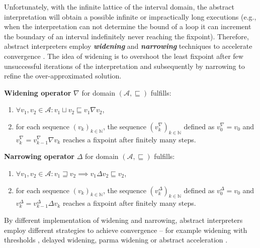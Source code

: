 Unfortunately, with the infinite lattice of the interval
domain, the
abstract interpretation will obtain a possible infinite or impractically long
executions (e.g., when the interpretation can not determine the bound of a loop
it can increment the boundary of an interval indefinitely never reaching the
fixpoint). Therefore, abstract interpreters employ \textbf{\emph{widening}} and
\textbf{\emph{narrowing}} techniques to accelerate convergence \cite{Cousot1992a,
Cortesi2011}.  The idea of wi\-de\-ning is to overshoot the least fixpoint
after few unsuccessful iterations of the interpretation and subsequently by
narrowing to refine the over-approximated solution.
\begin{definition}
    \textbf{Widening operator} $\nabla$ for domain $(\mathcal{A},
    \sqsubseteq)$ fulfills:
    \begin{enumerate}
        \item $\forall v_1, v_2 \in \mathcal{A} : v_1 \sqcup v_2 \sqsubseteq v_1 \nabla v_2$,
        \item for each sequence $(v_k)_{k \in \mathbb{N}}$, the sequence $(v^{\nabla}_k)_{k \in \mathbb{N}}$ defined as $v^{\nabla}_0 = v_0$ and $v^{\nabla}_k = v^{\nabla}_{k-1} \nabla v_k$ reaches a fixpoint after finitely many steps.
    \end{enumerate}
\end{definition}
\vspace{-1em}
\begin{definition}
    \textbf{Narrowing operator} $\Delta$ for domain $(\mathcal{A},
    \sqsubseteq)$ fulfills:
    \begin{enumerate}
        \item $\forall v_1, v_2 \in \mathcal{A} : v_1 \sqsupseteq v_2 \implies v_1 \Delta v_2 \sqsubseteq v_2$,
        \item for each sequence $(v_k)_{k \in \mathbb{N}}$, the sequence $(v^{\Delta}_k)_{k \in \mathbb{N}}$ defined as $v^{\Delta}_0 = v_0$ and $v^{\Delta}_k = v^{\Delta}_{k-1} \Delta v_k$ reaches a fixpoint after finitely many steps.
    \end{enumerate}
\end{definition}

\noindent
By different implementation of widening and narrowing, abstract interpreters
employ different strategies to achieve convergence -- for example widening
with thresholds \cite{Blanchet2003, Lakhdar2011}, delayed widening, parma widening
\cite{Bagnara2008} or abstract acceleration \cite{Gonnord2006, Feautrier2010}.

